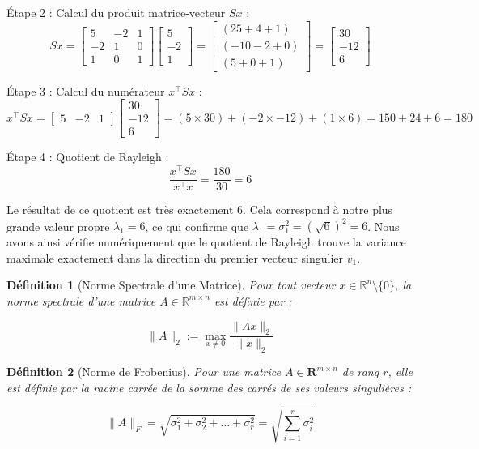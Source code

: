 \documentclass[12pt]{report}
\newtheorem{definition}{D\'{e}finition}
\newcommand{\R}{\mathbf{R}}     %
\begin{document}
Étape 2 : Calcul du produit matrice-vecteur $Sx$ :
$$Sx = \begin{bmatrix} 5 & -2 & 1 \\ -2 & 1 & 0 \\ 1 & 0 & 1 \end{bmatrix} \begin{bmatrix} 5 \\ -2 \\ 1 \end{bmatrix} = \begin{bmatrix} (25 + 4 + 1) \\ (-10 - 2 + 0) \\ (5 + 0 + 1) \end{bmatrix} = \begin{bmatrix} 30 \\ -12 \\ 6 \end{bmatrix}$$

Étape 3 : Calcul du numérateur $x^{\top} S x$ :
$$x^{\top} S x = \begin{bmatrix} 5 & -2 & 1 \end{bmatrix} \begin{bmatrix} 30 \\ -12 \\ 6 \end{bmatrix} = (5 \times 30) + (-2 \times -12) + (1 \times 6) = 150 + 24 + 6 = 180$$

Étape 4 : Quotient de Rayleigh :
$$\frac{x^{\top} S x}{x^{\top} x} = \frac{180}{30} = 6$$

\noindent Le résultat de ce quotient est très exactement $6$. Cela correspond à notre plus grande valeur propre $\lambda_1 = 6$, ce qui confirme que $\lambda_1 = \sigma_1^2 = (\sqrt{6})^2 = 6$. Nous avons ainsi vérifie numériquement que le quotient de Rayleigh trouve la variance maximale exactement dans la direction du premier vecteur singulier $v_1$.

\begin{definition}[Norme Spectrale d'une Matrice]
    Pour tout vecteur $x \in \mathbb{R}^n \setminus \{0\}$, la norme spectrale d'une matrice $A \in \mathbb{R}^{m \times n}$ est définie par :

    \begin{equation}
        \|A\|_2 := \max_{x \neq 0} \frac{\|Ax\|_2}{\|x\|_2}
    \end{equation}
\end{definition}

\begin{definition}[Norme de Frobenius]
    Pour une matrice $A \in \R^{m \times n}$ de rang $r$, elle est définie par la racine carrée de la somme des carrés de ses valeurs singulières :

    \begin{equation}
        \|A\|_F = \sqrt{\sigma_1^2 + \sigma_2^2 + \dots + \sigma_r^2} = \sqrt{\sum_{i=1}^{r} \sigma_i^2}
    \end{equation}
\end{definition}
\end{document}
